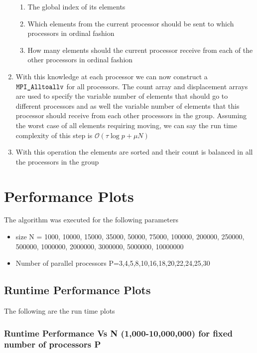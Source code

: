 \documentclass[twoside,11pt]{article}\usepackage{amsmath,amsfonts,amsthm,fullpage}
\begin{document}
\begin{enumerate}
\begin{enumerate}
\item
The global index of its elements
\item
Which elements from the current processor should be sent to which processors in ordinal fashion
\item
How many elements should the current processor receive from each of the other processors in ordinal fashion
\end{enumerate}
\item
With this knowledge at each processor we can now construct a $\verb|MPI_Alltoallv|$ for all processors. The count array and displacement arrays are used to specify the variable number of elements that should go to different processors and as well the variable number of elements that this processor should receive from each other processors in the group. Assuming the worst case of all elements requiring moving, we can say the run time complexity of this step is  $\mathcal{O}(\tau \log p + \mu N )$
\item
With this operation the elements are sorted and their count is balanced in all the processors in the group
\end{enumerate} 
 






\pagebreak
\section{Performance Plots}
The algorithm was executed for the following parameters
\begin{itemize}
\item
size N = 1000, 10000, 15000, 35000, 50000, 75000, 100000, 200000, 250000, 500000, 1000000, 2000000, 3000000, 5000000, 10000000
\item
Number of parallel processors P=3,4,5,8,10,16,18,20,22,24,25,30
\end{itemize}



\subsection{Runtime Performance Plots}

The following are the run time plots

\subsubsection{Runtime Performance Vs N (1,000-10,000,000)  for fixed number of processors P}
\end{document}
